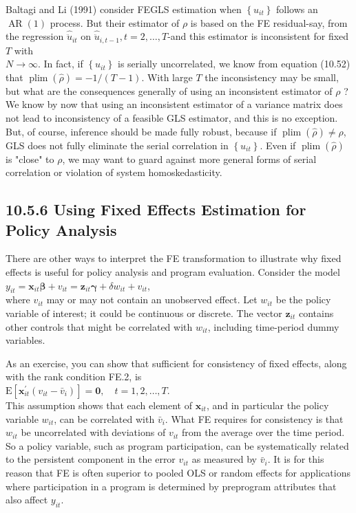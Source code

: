 \documentclass[10pt]{article}
\begin{document}
Baltagi and Li (1991) consider FEGLS estimation when $\left\{u_{i t}\right\}$ follows an $\operatorname{AR}(1)$ process. But their estimator of $\rho$ is based on the FE residual-say, from the regression $\hat{\ddot{u}}_{i t}$ on $\hat{\ddot{u}}_{i, t-1}, t=2, \ldots, T$-and this estimator is inconsistent for fixed $T$ with\\
$N \rightarrow \infty$. In fact, if $\left\{u_{i t}\right\}$ is serially uncorrelated, we know from equation (10.52) that $\operatorname{plim}(\hat{\rho})=-1 /(T-1)$. With large $T$ the inconsistency may be small, but what are the consequences generally of using an inconsistent estimator of $\rho$ ? We know by now that using an inconsistent estimator of a variance matrix does not lead to inconsistency of a feasible GLS estimator, and this is no exception. But, of course, inference should be made fully robust, because if $\operatorname{plim}(\hat{\rho}) \neq \rho$, GLS does not fully eliminate the serial correlation in $\left\{u_{i t}\right\}$. Even if $\operatorname{plim}(\hat{\rho})$ is "close" to $\rho$, we may want to guard against more general forms of serial correlation or violation of system homoskedasticity.

\subsection*{10.5.6 Using Fixed Effects Estimation for Policy Analysis}
There are other ways to interpret the FE transformation to illustrate why fixed effects is useful for policy analysis and program evaluation. Consider the model\\
$y_{i t}=\mathbf{x}_{i t} \boldsymbol{\beta}+v_{i t}=\mathbf{z}_{i t} \boldsymbol{\gamma}+\delta w_{i t}+v_{i t}$,\\
where $v_{i t}$ may or may not contain an unobserved effect. Let $w_{i t}$ be the policy variable of interest; it could be continuous or discrete. The vector $\mathbf{z}_{i t}$ contains other controls that might be correlated with $w_{i t}$, including time-period dummy variables.

As an exercise, you can show that sufficient for consistency of fixed effects, along with the rank condition FE.2, is\\
$\mathrm{E}\left[\mathbf{x}_{i t}^{\prime}\left(v_{i t}-\bar{v}_{i}\right)\right]=\mathbf{0}, \quad t=1,2, \ldots, T$.\\
This assumption shows that each element of $\mathbf{x}_{i t}$, and in particular the policy variable $w_{i t}$, can be correlated with $\bar{v}_{i}$. What FE requires for consistency is that $w_{i t}$ be uncorrelated with deviations of $v_{i t}$ from the average over the time period. So a policy variable, such as program participation, can be systematically related to the persistent component in the error $v_{i t}$ as measured by $\bar{v}_{i}$. It is for this reason that FE is often superior to pooled OLS or random effects for applications where participation in a program is determined by preprogram attributes that also affect $y_{i t}$.
\end{document}
